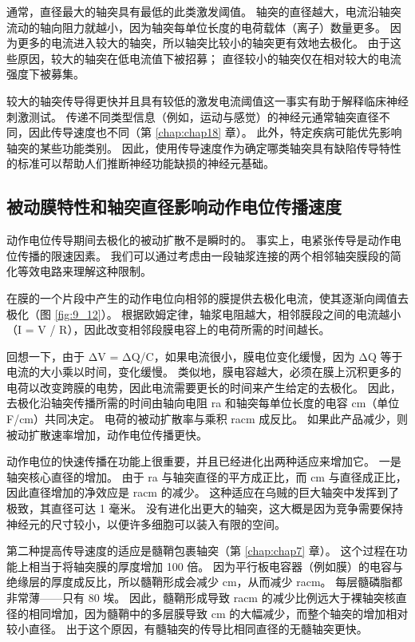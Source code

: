 通常，直径最大的轴突具有最低的此类激发阈值。 
轴突的直径越大，电流沿轴突流动的轴向阻力就越小，因为轴突每单位长度的电荷载体（离子）数量更多。 
因为更多的电流进入较大的轴突，所以轴突比较小的轴突更有效地去极化。 
由于这些原因，较大的轴突在低电流值下被招募； 
直径较小的轴突仅在相对较大的电流强度下被募集。


较大的轴突传导得更快并且具有较低的激发电流阈值这一事实有助于解释临床神经刺激测试。 
传递不同类型信息（例如，运动与感觉）的神经元通常轴突直径不同，因此传导速度也不同（第 \ref{chap:chap18} 章）。 
此外，特定疾病可能优先影响轴突的某些功能类别。 
因此，使用传导速度作为确定哪类轴突具有缺陷传导特性的标准可以帮助人们推断神经功能缺损的神经元基础。


\subsection{被动膜特性和轴突直径影响动作电位传播速度}

动作电位传导期间去极化的被动扩散不是瞬时的。 
事实上，电紧张传导是动作电位传播的限速因素。 
我们可以通过考虑由一段轴浆连接的两个相邻轴突膜段的简化等效电路来理解这种限制。


在膜的一个片段中产生的动作电位向相邻的膜提供去极化电流，使其逐渐向阈值去极化（图 \ref{fig:9_12}）。 
根据欧姆定律，轴浆电阻越大，相邻膜段之间的电流越小（I = V / R），因此改变相邻段膜电容上的电荷所需的时间越长。


回想一下，由于 ΔV = ΔQ/C，如果电流很小，膜电位变化缓慢，因为 ΔQ 等于电流的大小乘以时间，变化缓慢。 
类似地，膜电容越大，必须在膜上沉积更多的电荷以改变跨膜的电势，因此电流需要更长的时间来产生给定的去极化。 
因此，去极化沿轴突传播所需的时间由轴向电阻 ra 和轴突每单位长度的电容 cm（单位 F/cm）共同决定。 
电荷的被动扩散率与乘积 racm 成反比。 
如果此产品减少，则被动扩散速率增加，动作电位传播更快。


动作电位的快速传播在功能上很重要，并且已经进化出两种适应来增加它。 
一是轴突核心直径的增加。 
由于 ra 与轴突直径的平方成正比，而 cm 与直径成正比，因此直径增加的净效应是 racm 的减少。 
这种适应在乌贼的巨大轴突中发挥到了极致，其直径可达 1 毫米。 
没有进化出更大的轴突，这大概是因为竞争需要保持神经元的尺寸较小，以便许多细胞可以装入有限的空间。


第二种提高传导速度的适应是髓鞘包裹轴突（第 \ref{chap:chap7} 章）。 
这个过程在功能上相当于将轴突膜的厚度增加 100 倍。 
因为平行板电容器（例如膜）的电容与绝缘层的厚度成反比，所以髓鞘形成会减少 cm，从而减少 racm。 
每层髓磷脂都非常薄——只有 80 埃。 
因此，髓鞘形成导致 racm 的减少比例远大于裸轴突核直径的相同增加，因为髓鞘中的多层膜导致 cm 的大幅减少，而整个轴突的增加相对较小直径。 
出于这个原因，有髓轴突的传导比相同直径的无髓轴突更快。


